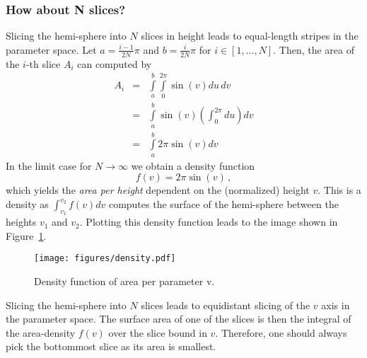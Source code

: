 \documentclass{scrartcl}
\begin{document}
\subsubsection*{How about N slices?}
Slicing the hemi-sphere into $N$ slices in height leads to equal-length stripes in the parameter space.
Let $a = \frac{i-1}{2N}\pi$ and $b = \frac{i}{2N}\pi$ for $i \in [1, \ldots, N]$. Then, the area of the $i$-th slice $A_i$ can computed by
\begin{eqnarray}
	A_i &=& \int\limits_a^b \int\limits_0^{2\pi} \sin(v) du\, dv\\
	&=& \int\limits_a^b \sin(v) \left(\int_0^{2\pi} du\right)dv\\\nonumber
	&=& \int\limits_a^b 2\pi \sin(v) dv\nonumber
\end{eqnarray}
In the limit case for $N \rightarrow \infty$ we obtain a density function
\begin{equation}
	f(v) = 2\pi \sin(v)\, ,
\end{equation}
which yields the \emph{area per height} dependent on the (normalized) height $v$. This is a density as $\int_{v_1}^{v_2} f(v)dv$ computes the surface of the hemi-sphere between the heights $v_1$ and $v_2$. Plotting this density function leads to the image shown in Figure~\ref{fig:area_density}.
\begin{figure}[h]
	\centering
	\texttt{[image: figures/density.pdf]}
	\caption{Density function of area per parameter v.}
	\label{fig:area_density}
\end{figure}

\noindent
Slicing the hemi-sphere into $N$ slices leads to equidistant slicing of the $v$ axis in the parameter space.
The surface area of one of the slices is then the integral of the area-density $f(v)$ over the slice bound in $v$. Therefore, one should always pick the bottommost slice as its area is smallest.
\end{document}
